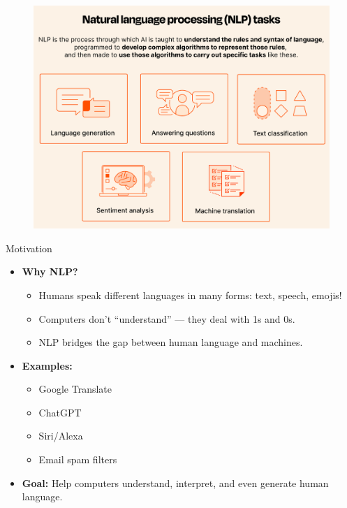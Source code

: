 \begin{frame}[allowframebreaks]{}
    \begin{figure}
        \centering
        \includegraphics[height=0.9\textheight, width=\textwidth, keepaspectratio]{images/nlp/cover.png}
    \end{figure}
\end{frame}

\begin{frame}{Motivation}
    \begin{itemize}
        \item \textbf{Why NLP?}
        \begin{itemize}
            \item Humans speak different languages in many forms: text, speech, emojis!
            \item Computers don’t “understand” — they deal with 1s and 0s.
            \item NLP bridges the gap between human language and machines.
        \end{itemize}
        \item \textbf{Examples:}
        \begin{itemize}
            \item Google Translate
            \item ChatGPT
            \item Siri/Alexa
            \item Email spam filters
        \end{itemize}
        \item \textbf{Goal:} Help computers understand, interpret, and even generate human language.
    \end{itemize}
\end{frame}